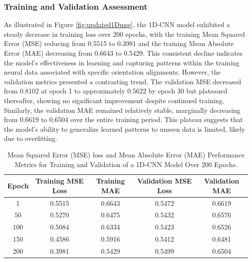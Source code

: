 \documentclass[a4paper]{article}
\begin{document}
\subsubsection{Training and Validation Assessment}
As illustrated in Figure \ref{fig:updated1Dmse}, the 1D-CNN model exhibited a steady decrease in training loss over 200 epochs, with the training Mean Squared Error (MSE) reducing from 0.5515 to 0.3981 and the training Mean Absolute Error (MAE) decreasing from 0.6643 to 0.5429. This consistent decline indicates the model's effectiveness in learning and capturing patterns within the training neural data associated with specific orientation alignments. However, the validation metrics presented a contrasting trend. The validation MSE decreased from 0.8102 at epoch 1 to approximately 0.5622 by epoch 30 but plateaued thereafter, showing no significant improvement despite continued training. Similarly, the validation MAE remained relatively stable, marginally decreasing from 0.6619 to 0.6504 over the entire training period. This plateau suggests that the model's ability to generalize learned patterns to unseen data is limited, likely due to overfitting.

\begin{table}[H]
\centering
\begin{tabular}{|c|c|c|c|c|}
\hline
\textbf{Epoch} & \textbf{Training MSE Loss} & \textbf{Training MAE} & \textbf{Validation MSE Loss} & \textbf{Validation MAE} \\ \hline
1              & 0.5515                     & 0.6643                & 0.5472                       & 0.6619                  \\ \hline
50             & 0.5270                     & 0.6475                & 0.5432                       & 0.6576                  \\ \hline
100            & 0.5084                     & 0.6334                & 0.5423                       & 0.6526                  \\ \hline
150            & 0.4586                     & 0.5916                & 0.5412                       & 0.6481                  \\ \hline
200            & 0.3981                     & 0.5429                & 0.5499                       & 0.6504                  \\ \hline
\end{tabular}
\caption{Mean Squared Error (MSE) loss and Mean Absolute Error (MAE) Performance Metrics for Training and Validation of a 1D-CNN Model Over 200 Epochs.}
\label{tab:1dcnnmodel_performance}
\end{table}
\end{document}
